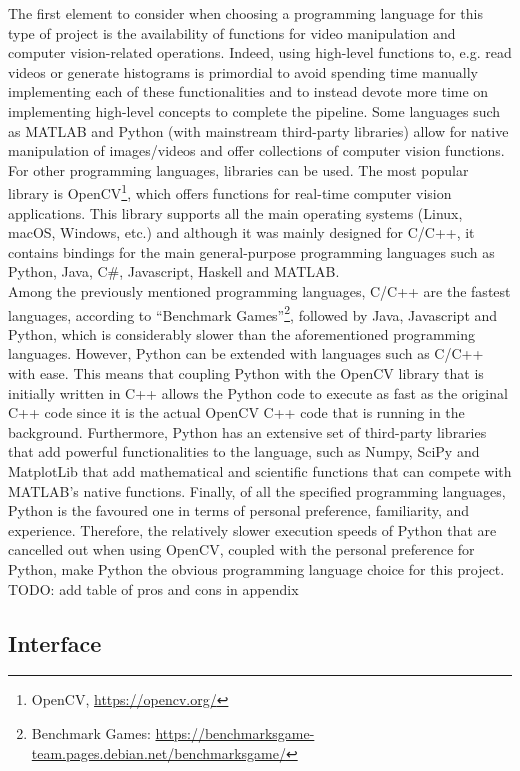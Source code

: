 The first element to consider when choosing a programming language for this type of project is the availability of functions for video manipulation and computer vision-related operations. Indeed, using high-level functions to, e.g. read videos or generate histograms is primordial to avoid spending time manually implementing each of these functionalities and to instead devote more time on implementing high-level concepts to complete the pipeline. Some languages such as MATLAB and Python (with mainstream third-party libraries) allow for native manipulation of images/videos and offer collections of computer vision functions. For other programming languages, libraries can be used. The most popular library is OpenCV\footnote{OpenCV, \url{https://opencv.org/}}, which offers functions for real-time computer vision applications. This library supports all the main operating systems (Linux, macOS, Windows, etc.) and although it was mainly designed for C/C++, it contains bindings for the main general-purpose programming languages such as Python, Java, C\#, Javascript, Haskell and MATLAB.\\

Among the previously mentioned programming languages, C/C++ are the fastest languages,
according to ``Benchmark Games''\footnote{Benchmark Games: \url{https://benchmarksgame-team.pages.debian.net/benchmarksgame/}}, followed by Java, Javascript and Python, which is considerably slower than the aforementioned programming languages. However, Python can be extended with languages such as C/C++ with ease. This means that coupling Python with the OpenCV library that is initially written in C++ allows the Python code to execute as fast as the original C++ code since it is the actual OpenCV C++ code that is running in the background. Furthermore, Python has an extensive set of third-party libraries that add powerful functionalities to the language, such as Numpy, SciPy and MatplotLib that add mathematical and scientific functions that can compete with MATLAB's native functions. Finally, of all the specified programming languages, Python is the favoured one in terms of personal preference, familiarity, and experience. Therefore, the relatively slower execution speeds of Python that are cancelled out when using OpenCV, coupled with the personal preference for Python, make Python the obvious programming language choice for this project.\\

TODO: add table of pros and cons in appendix

\subsection{Interface}

